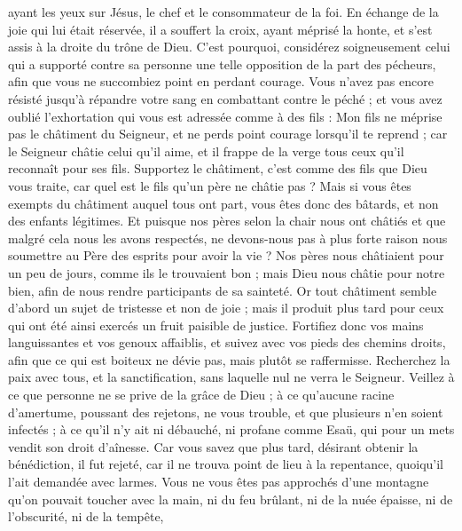 \begin{multicols}{2}
ayant les yeux sur Jésus, le chef et le consommateur de la foi. En échange de la joie qui lui était réservée, il a souffert la croix, ayant méprisé la honte, et s'est assis à la droite du trône de Dieu.
C'est pourquoi, considérez soigneusement celui qui a supporté contre sa personne une telle opposition de la part des pécheurs, afin que vous ne succombiez point en perdant courage.
Vous n'avez pas encore résisté jusqu'à répandre votre sang en combattant contre le péché ;
et vous avez oublié l'exhortation qui vous est adressée comme à des fils : Mon fils ne méprise pas le châtiment du Seigneur, et ne perds point courage lorsqu’il te reprend ;
car le Seigneur châtie celui qu'il aime, et il frappe de la verge tous ceux qu’il reconnaît pour ses fils.
Supportez le châtiment, c’est comme des fils que Dieu vous traite, car quel est le fils qu’un père ne châtie pas ?
Mais si vous êtes exempts du châtiment auquel tous ont part, vous êtes donc des bâtards, et non des enfants légitimes.
Et puisque nos pères selon la chair nous ont châtiés et que malgré cela nous les avons respectés, ne devons-nous pas à plus forte raison nous soumettre au Père des esprits pour avoir la vie ?
Nos pères nous châtiaient pour un peu de jours, comme ils le trouvaient bon ; mais Dieu nous châtie pour notre bien, afin de nous rendre participants de sa sainteté.
Or tout châtiment semble d’abord un sujet de tristesse et non de joie ; mais il produit plus tard pour ceux qui ont été ainsi exercés un fruit paisible de justice.
Fortifiez donc vos mains languissantes et vos genoux affaiblis,
et suivez avec vos pieds des chemins droits, afin que ce qui est boiteux ne dévie pas, mais plutôt se raffermisse.
Recherchez la paix avec tous, et la sanctification, sans laquelle nul ne verra le Seigneur.
Veillez à ce que personne ne se prive de la grâce de Dieu ; à ce qu’aucune racine d'amertume, poussant des rejetons, ne vous trouble, et que plusieurs n’en soient infectés ;
à ce qu’il n’y ait ni débauché, ni profane comme Esaü, qui pour un mets vendit son droit d’aînesse.
Car vous savez que plus tard, désirant obtenir la bénédiction, il fut rejeté, car il ne trouva point de lieu à la repentance, quoiqu'il l’ait demandée avec larmes.
Vous ne vous êtes pas approchés d’une montagne qu’on pouvait toucher avec la main, ni du feu brûlant, ni de la nuée épaisse, ni de l'obscurité, ni de la tempête,

\end{multicols}
